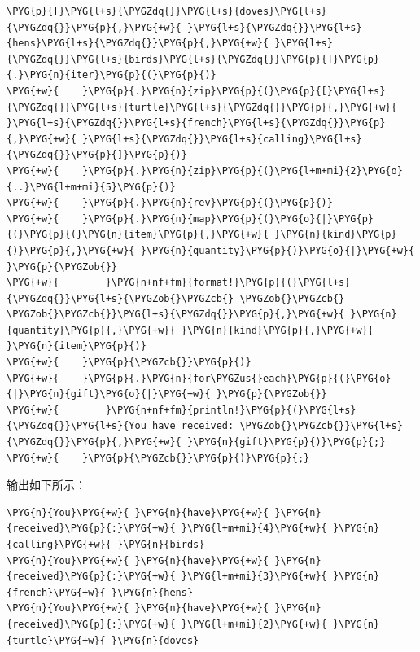 \begin{Verbatim}[commandchars=\\\{\},breaklines=true,breakanywhere=true,fontsize=\codefont,xleftmargin=17bp]
\PYG{p}{[}\PYG{l+s}{\PYGZdq{}}\PYG{l+s}{doves}\PYG{l+s}{\PYGZdq{}}\PYG{p}{,}\PYG{+w}{ }\PYG{l+s}{\PYGZdq{}}\PYG{l+s}{hens}\PYG{l+s}{\PYGZdq{}}\PYG{p}{,}\PYG{+w}{ }\PYG{l+s}{\PYGZdq{}}\PYG{l+s}{birds}\PYG{l+s}{\PYGZdq{}}\PYG{p}{]}\PYG{p}{.}\PYG{n}{iter}\PYG{p}{(}\PYG{p}{)}
\PYG{+w}{    }\PYG{p}{.}\PYG{n}{zip}\PYG{p}{(}\PYG{p}{[}\PYG{l+s}{\PYGZdq{}}\PYG{l+s}{turtle}\PYG{l+s}{\PYGZdq{}}\PYG{p}{,}\PYG{+w}{ }\PYG{l+s}{\PYGZdq{}}\PYG{l+s}{french}\PYG{l+s}{\PYGZdq{}}\PYG{p}{,}\PYG{+w}{ }\PYG{l+s}{\PYGZdq{}}\PYG{l+s}{calling}\PYG{l+s}{\PYGZdq{}}\PYG{p}{]}\PYG{p}{)}
\PYG{+w}{    }\PYG{p}{.}\PYG{n}{zip}\PYG{p}{(}\PYG{l+m+mi}{2}\PYG{o}{..}\PYG{l+m+mi}{5}\PYG{p}{)}
\PYG{+w}{    }\PYG{p}{.}\PYG{n}{rev}\PYG{p}{(}\PYG{p}{)}
\PYG{+w}{    }\PYG{p}{.}\PYG{n}{map}\PYG{p}{(}\PYG{o}{|}\PYG{p}{(}\PYG{p}{(}\PYG{n}{item}\PYG{p}{,}\PYG{+w}{ }\PYG{n}{kind}\PYG{p}{)}\PYG{p}{,}\PYG{+w}{ }\PYG{n}{quantity}\PYG{p}{)}\PYG{o}{|}\PYG{+w}{ }\PYG{p}{\PYGZob{}}
\PYG{+w}{        }\PYG{n+nf+fm}{format!}\PYG{p}{(}\PYG{l+s}{\PYGZdq{}}\PYG{l+s}{\PYGZob{}\PYGZcb{} \PYGZob{}\PYGZcb{} \PYGZob{}\PYGZcb{}}\PYG{l+s}{\PYGZdq{}}\PYG{p}{,}\PYG{+w}{ }\PYG{n}{quantity}\PYG{p}{,}\PYG{+w}{ }\PYG{n}{kind}\PYG{p}{,}\PYG{+w}{ }\PYG{n}{item}\PYG{p}{)}
\PYG{+w}{    }\PYG{p}{\PYGZcb{}}\PYG{p}{)}
\PYG{+w}{    }\PYG{p}{.}\PYG{n}{for\PYGZus{}each}\PYG{p}{(}\PYG{o}{|}\PYG{n}{gift}\PYG{o}{|}\PYG{+w}{ }\PYG{p}{\PYGZob{}}
\PYG{+w}{        }\PYG{n+nf+fm}{println!}\PYG{p}{(}\PYG{l+s}{\PYGZdq{}}\PYG{l+s}{You have received: \PYGZob{}\PYGZcb{}}\PYG{l+s}{\PYGZdq{}}\PYG{p}{,}\PYG{+w}{ }\PYG{n}{gift}\PYG{p}{)}\PYG{p}{;}
\PYG{+w}{    }\PYG{p}{\PYGZcb{}}\PYG{p}{)}\PYG{p}{;}
\end{Verbatim}

输出如下所示：

\begin{Verbatim}[commandchars=\\\{\},breaklines=true,breakanywhere=true,fontsize=\codefont,xleftmargin=17bp]
\PYG{n}{You}\PYG{+w}{ }\PYG{n}{have}\PYG{+w}{ }\PYG{n}{received}\PYG{p}{:}\PYG{+w}{ }\PYG{l+m+mi}{4}\PYG{+w}{ }\PYG{n}{calling}\PYG{+w}{ }\PYG{n}{birds}
\PYG{n}{You}\PYG{+w}{ }\PYG{n}{have}\PYG{+w}{ }\PYG{n}{received}\PYG{p}{:}\PYG{+w}{ }\PYG{l+m+mi}{3}\PYG{+w}{ }\PYG{n}{french}\PYG{+w}{ }\PYG{n}{hens}
\PYG{n}{You}\PYG{+w}{ }\PYG{n}{have}\PYG{+w}{ }\PYG{n}{received}\PYG{p}{:}\PYG{+w}{ }\PYG{l+m+mi}{2}\PYG{+w}{ }\PYG{n}{turtle}\PYG{+w}{ }\PYG{n}{doves}
\end{Verbatim}

